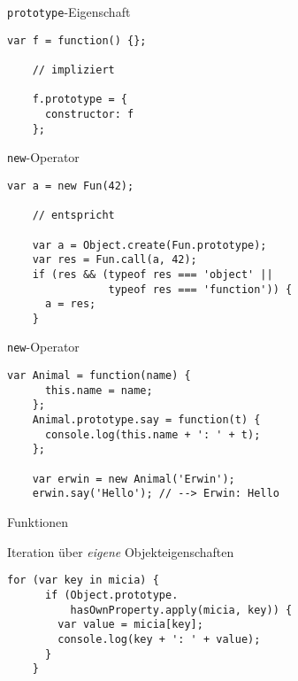 \begin{frame}[fragile]{\lstinline-prototype--Eigenschaft}
  \begin{lstlisting}[gobble=4]
    var f = function() {};
    
    // impliziert
    
    f.prototype = {
      constructor: f
    };
  \end{lstlisting}
\end{frame}

\begin{frame}[fragile]{\lstinline-new--Operator}
  \begin{lstlisting}[gobble=4]
    var a = new Fun(42);

    // entspricht  
  
    var a = Object.create(Fun.prototype);
    var res = Fun.call(a, 42);
    if (res && (typeof res === 'object' ||
                typeof res === 'function')) {
      a = res;
    }
  \end{lstlisting}
\end{frame}

\begin{frame}[fragile]{\lstinline-new--Operator}
  \begin{lstlisting}[gobble=4]
    var Animal = function(name) {
      this.name = name;
    };
    Animal.prototype.say = function(t) {
      console.log(this.name + ': ' + t);
    };
    
    var erwin = new Animal('Erwin');
    erwin.say('Hello'); // --> Erwin: Hello
  \end{lstlisting}
\end{frame}

\begin{frame}{Funktionen}
  \begin{center}
  \end{center}
\end{frame}

\begin{frame}[fragile]{Iteration über \emph{eigene} Objekteigenschaften}
  \begin{lstlisting}[gobble=4]
    for (var key in micia) {
      if (Object.prototype.
          hasOwnProperty.apply(micia, key)) {
        var value = micia[key];
        console.log(key + ': ' + value);
      }
    }
  \end{lstlisting}
\end{frame}

